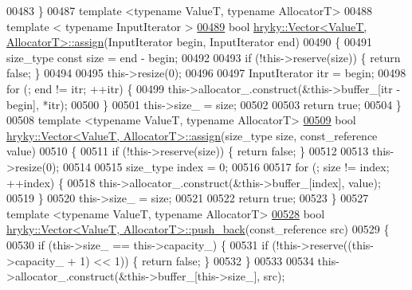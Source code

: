 \begin{DoxyCode}
00483 \}
00487 \textcolor{keyword}{template} <\textcolor{keyword}{typename} ValueT, \textcolor{keyword}{typename} AllocatorT>
00488 \textcolor{keyword}{template} < \textcolor{keyword}{typename} InputIterator >
\hypertarget{vector_8h_source_l00489}{}\hyperlink{classhryky_1_1_vector_af06670e87dfdd1ae0afadafaeb6e504c}{00489} \textcolor{keywordtype}{bool} \hyperlink{classhryky_1_1_vector}{hryky::Vector<ValueT, AllocatorT>::assign}(InputIterator begin, 
      InputIterator end)
00490 \{
00491     size\_type \textcolor{keyword}{const} size = end - begin;
00492 
00493     \textcolor{keywordflow}{if} (!this->reserve(size)) \{ \textcolor{keywordflow}{return} \textcolor{keyword}{false}; \}
00494 
00495     this->resize(0);
00496 
00497     InputIterator itr = begin;
00498     \textcolor{keywordflow}{for} (; end != itr; ++itr) \{
00499         this->allocator\_.construct(&this->buffer\_[itr - begin], *itr);
00500     \}
00501     this->size\_ = size;
00502 
00503     \textcolor{keywordflow}{return} \textcolor{keyword}{true};
00504 \}
00508 \textcolor{keyword}{template} <\textcolor{keyword}{typename} ValueT, \textcolor{keyword}{typename} AllocatorT>
\hypertarget{vector_8h_source_l00509}{}\hyperlink{classhryky_1_1_vector_aebecb6f0b81899b791a9ab577344042a}{00509} \textcolor{keywordtype}{bool} \hyperlink{classhryky_1_1_vector}{hryky::Vector<ValueT, AllocatorT>::assign}(size\_type size, const\_reference 
      value)
00510 \{
00511     \textcolor{keywordflow}{if} (!this->reserve(size)) \{ \textcolor{keywordflow}{return} \textcolor{keyword}{false}; \}
00512 
00513     this->resize(0);
00514 
00515     size\_type index = 0;
00516 
00517     \textcolor{keywordflow}{for} (; size != index; ++index) \{
00518         this->allocator\_.construct(&this->buffer\_[index], value);
00519     \}
00520     this->size\_ = size;
00521 
00522     \textcolor{keywordflow}{return} \textcolor{keyword}{true};
00523 \}
00527 \textcolor{keyword}{template} <\textcolor{keyword}{typename} ValueT, \textcolor{keyword}{typename} AllocatorT>
\hypertarget{vector_8h_source_l00528}{}\hyperlink{classhryky_1_1_vector_ad977480678e6051db6d10a6abc3a54b7}{00528} \textcolor{keywordtype}{bool} \hyperlink{classhryky_1_1_vector}{hryky::Vector<ValueT, AllocatorT>::push_back}(const\_reference src)
00529 \{
00530     \textcolor{keywordflow}{if} (this->size\_ == this->capacity\_) \{
00531         \textcolor{keywordflow}{if} (!this->reserve((this->capacity\_ + 1) << 1)) \{ \textcolor{keywordflow}{return} \textcolor{keyword}{false}; \}
00532     \}
00533 
00534     this->allocator\_.construct(&this->buffer\_[this->size\_], src);

\end{DoxyCode}
